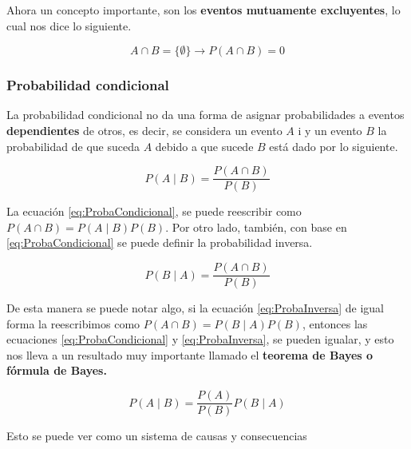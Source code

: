 

Ahora un concepto importante, son los \textbf{eventos mutuamente excluyentes}, lo cual nos dice lo siguiente.

\begin{equation*}
    A\cap B = \{ \emptyset \} \rightarrow P(A\cap B) = 0
\end{equation*}

\subsubsection{Probabilidad condicional}

La probabilidad condicional no da una forma de asignar probabilidades a eventos \textbf{dependientes} de otros, es decir, se considera un evento $A$ i y un evento $B$ la probabilidad de que suceda $A$ debido a que sucede $B$ está dado por lo siguiente.

\begin{equation}
    P(A\mid B) = \frac{P(A\cap B)}{P(B)}
    \label{eq:ProbaCondicional}
\end{equation}

La ecuación \eqref{eq:ProbaCondicional}, se puede reescribir como $P(A\cap B) = P(A\mid B)P(B)$. Por otro lado, también, con base en \eqref{eq:ProbaCondicional} se puede definir la probabilidad inversa.

\begin{equation}
    P(B\mid A) = \frac{P(A\cap B)}{P(B)}
    \label{eq:ProbaInversa}
\end{equation}

De esta manera se puede notar algo, si la ecuación \eqref{eq:ProbaInversa} de igual forma la reescribimos como $P(A\cap B) = P(B\mid A) P(B)$, entonces las ecuaciones \eqref{eq:ProbaCondicional} y \eqref{eq:ProbaInversa}, se pueden igualar, y esto nos lleva a un resultado muy importante llamado el \textbf{teorema de Bayes o fórmula de Bayes.}

\begin{tcolorbox}[colback=mycafeF!5!white,colframe=mycafeF,title=\textbf{Teorema de Bayes}]

\begin{equation}
    P(A\mid B) = \frac{P(A)}{P(B)}P(B\mid A)
    \label{eq:TeoBayes}
\end{equation}

Esto se puede ver como un sistema de causas y consecuencias
    
\end{tcolorbox}

